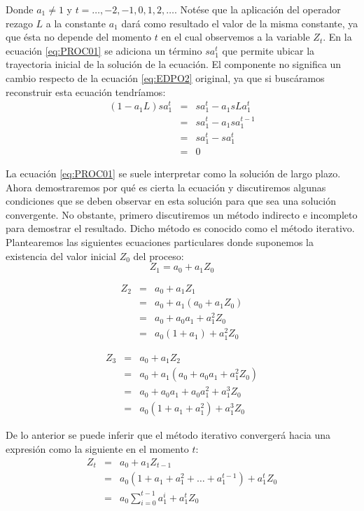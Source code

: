 \documentclass[
]{book}
\begin{document}
Donde \(a_1 \neq 1\) y \(t = \ldots, -2, -1, 0, 1, 2, \ldots\). Notése que la aplicación del operador rezago \(L\) a la constante \(a_1\) dará como resultado el valor de la misma constante, ya que ésta no depende del momento \(t\) en el cual observemos a la variable \(Z_t\). En la ecuación \eqref{eq:PROC01} se adiciona un término \(s a^t_1\) que permite ubicar la trayectoria inicial de la solución de la ecuación. El componente no significa un cambio respecto de la ecuación \eqref{eq:EDPO2} original, ya que si buscáramos reconstruir esta ecuación tendríamos:
\begin{eqnarray}
    (1 - a_1 L) s a^t_1 & = & s a^t_1 - a_1 s L a^{t}_1 \nonumber \\
    & = & s a^t_1 - a_1 s a^{t - 1}_1 \nonumber \\
    & = & s a^t_1 - s a^t_1 \nonumber \\
    & = & 0 \nonumber
\end{eqnarray}

La ecuación \eqref{eq:PROC01} se suele interpretar como la solución de largo plazo. Ahora demostraremos por qué es cierta la ecuación y discutiremos algunas condiciones que se deben observar en esta solución para que sea una solución convergente. No obstante, primero discutiremos un método indirecto e incompleto para demostrar el resultado. Dicho método es conocido como el método iterativo. Plantearemos las siguientes ecuaciones particulares donde suponemos la existencia del valor inicial \(Z_0\) del proceso:
\begin{equation*}
    Z_1 = a_0 + a_1 Z_0
\end{equation*}

\begin{eqnarray*}
Z_2 & = & a_0 + a_1 Z_1 \\
    & = & a_0 + a_1 (a_0 + a_1 Z_0) \\
    & = & a_0 +  a_0 a_1 + a^2_1 Z_0 \\
    & = & a_0 (1 + a_1) + a^2_1 Z_0
\end{eqnarray*}

\begin{eqnarray*}
Z_3 & = & a_0 + a_1 Z_2 \\
    & = & a_0 + a_1 (a_0 +  a_0 a_1 + a^2_1 Z_0) \\
    & = & a_0 +  a_0 a_1 + a_0 a^2_1 + a^3_1 Z_0 \\
    & = & a_0 (1 + a_1 + a^2_1) + a^3_1 Z_0
\end{eqnarray*}

De lo anterior se puede inferir que el método iterativo convergerá hacia una expresión como la siguiente en el momento \(t\):
\begin{eqnarray}
Z_t & = & a_0 + a_1 Z_{t-1} \nonumber \\
    & = & a_0 (1 + a_1 + a^2_1 + \ldots + a^{t-1}_1) + a^t_1 Z_0 \nonumber \\
    & = & a_0 \sum^{t-1}_{i = 0}{a^i_1} + a^t_1 Z_0
    \label{eq:SUM}
\end{eqnarray}
\end{document}
